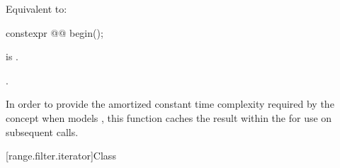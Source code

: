 \begin{itemdescr}
\pnum
\effects
Equivalent to: 
\end{itemdescr}

%
\begin{itemdecl}
constexpr @@ begin();
\end{itemdecl}

\begin{itemdescr}
\pnum
\expects
{} is .

\pnum
\returns
{}.

\pnum
\remarks
In order to provide the amortized constant time complexity required by
the  concept
when  models ,
this function caches the result within the
 for use on subsequent calls.
\end{itemdescr}

[range.filter.iterator]{Class }

